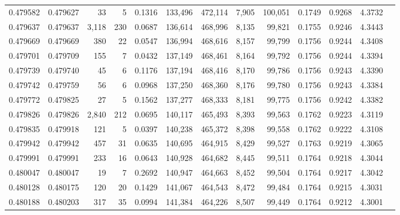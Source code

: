 \begin{tabular}{rrrrrrrrrrrrr}
0.479582 & 0.479627 &    33 &     5 &                                     0.1316 & 133,496 & 472,114 &   7,905 & 100,051 & 0.1749 & 0.9268 & 4.3732 \\
0.479637 & 0.479637 & 3,118 &   230 &                                     0.0687 & 136,614 & 468,996 &   8,135 &  99,821 & 0.1755 & 0.9246 & 4.3443 \\
0.479669 & 0.479669 &   380 &    22 &                                     0.0547 & 136,994 & 468,616 &   8,157 &  99,799 & 0.1756 & 0.9244 & 4.3408 \\
0.479701 & 0.479709 &   155 &     7 &                                     0.0432 & 137,149 & 468,461 &   8,164 &  99,792 & 0.1756 & 0.9244 & 4.3394 \\
0.479739 & 0.479740 &    45 &     6 &                                     0.1176 & 137,194 & 468,416 &   8,170 &  99,786 & 0.1756 & 0.9243 & 4.3390 \\
0.479742 & 0.479759 &    56 &     6 &                                     0.0968 & 137,250 & 468,360 &   8,176 &  99,780 & 0.1756 & 0.9243 & 4.3384 \\
0.479772 & 0.479825 &    27 &     5 &                                     0.1562 & 137,277 & 468,333 &   8,181 &  99,775 & 0.1756 & 0.9242 & 4.3382 \\
0.479826 & 0.479826 & 2,840 &   212 &                                     0.0695 & 140,117 & 465,493 &   8,393 &  99,563 & 0.1762 & 0.9223 & 4.3119 \\
0.479835 & 0.479918 &   121 &     5 &                                     0.0397 & 140,238 & 465,372 &   8,398 &  99,558 & 0.1762 & 0.9222 & 4.3108 \\
0.479942 & 0.479942 &   457 &    31 &                                     0.0635 & 140,695 & 464,915 &   8,429 &  99,527 & 0.1763 & 0.9219 & 4.3065 \\
0.479991 & 0.479991 &   233 &    16 &                                     0.0643 & 140,928 & 464,682 &   8,445 &  99,511 & 0.1764 & 0.9218 & 4.3044 \\
0.480047 & 0.480047 &    19 &     7 &                                     0.2692 & 140,947 & 464,663 &   8,452 &  99,504 & 0.1764 & 0.9217 & 4.3042 \\
0.480128 & 0.480175 &   120 &    20 &                                     0.1429 & 141,067 & 464,543 &   8,472 &  99,484 & 0.1764 & 0.9215 & 4.3031 \\
0.480188 & 0.480203 &   317 &    35 &                                     0.0994 & 141,384 & 464,226 &   8,507 &  99,449 & 0.1764 & 0.9212 & 4.3001 \\

\end{tabular}
